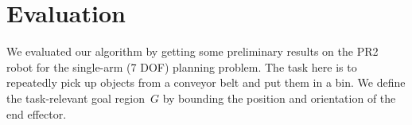 \documentclass[letterpaper]{article} %
\begin{document}
\section{Evaluation}
\begin{table}[tb]
    \caption{Experimental results comparing our method with \textsf{PRM}. The table shows the mean/worst-case planning times and success rates for our method and for \textsf{PRM} preprocessed with equal, double and quadruple the time that our method takes in precomputation (T = 984 seconds).}
    \label{tab:stats}
 \vspace{-6mm}
\end{table}

We evaluated our algorithm by getting some preliminary results on the PR2 robot for the single-arm (7 DOF) planning problem. The task here is to repeatedly pick up objects from a conveyor belt and put them in a bin. 
We define the task-relevant goal region~$G$ by bounding the position and orientation of the end effector. 

\end{document}
